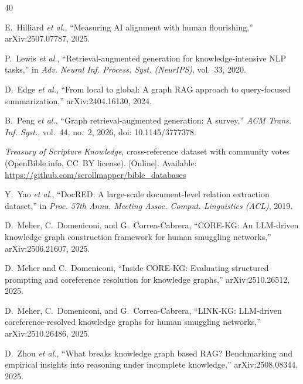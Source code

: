 
\begin{thebibliography}{40}

E.~Hilliard \emph{et al.}, ``Measuring AI alignment with human
flourishing,'' arXiv:2507.07787, 2025.

P.~Lewis \emph{et al.}, ``Retrieval-augmented generation for
knowledge-intensive NLP tasks,'' in \emph{Adv. Neural Inf. Process. Syst.
(NeurIPS)}, vol.~33, 2020.

D.~Edge \emph{et al.}, ``From local to global: A graph RAG approach to
query-focused summarization,'' arXiv:2404.16130, 2024.

B.~Peng \emph{et al.}, ``Graph retrieval-augmented generation: A survey,''
\emph{ACM Trans. Inf. Syst.}, vol.~44, no.~2, 2026, doi:
10.1145/3777378.

\emph{Treasury of Scripture Knowledge}, cross-reference dataset with
community votes (OpenBible.info, CC~BY license). [Online]. Available:
\url{https://github.com/scrollmapper/bible_databases}

Y.~Yao \emph{et al.}, ``DocRED: A large-scale document-level relation
extraction dataset,'' in \emph{Proc. 57th Annu. Meeting Assoc. Comput.
Linguistics (ACL)}, 2019.

D.~Meher, C.~Domeniconi, and G.~Correa-Cabrera, ``CORE-KG: An LLM-driven
knowledge graph construction framework for human smuggling networks,''
arXiv:2506.21607, 2025.

D.~Meher and C.~Domeniconi, ``Inside CORE-KG: Evaluating structured
prompting and coreference resolution for knowledge graphs,''
arXiv:2510.26512, 2025.

D.~Meher, C.~Domeniconi, and G.~Correa-Cabrera, ``LINK-KG: LLM-driven
coreference-resolved knowledge graphs for human smuggling networks,''
arXiv:2510.26486, 2025.

D.~Zhou \emph{et al.}, ``What breaks knowledge graph based RAG?
Benchmarking and empirical insights into reasoning under incomplete
knowledge,'' arXiv:2508.08344, 2025.


\end{thebibliography}
